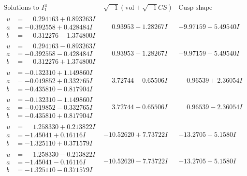 \documentclass[1p]{elsarticle_modified}
\theoremstyle{definition}
\newcommand{\I}{\sqrt{-1}}
\begin{document}
$$\begin{array}{c|c|c}  
\text{Solutions to }I^u_{1}& \I (\text{vol} + \sqrt{-1}CS) & \text{Cusp shape}\\
 \hline 
\begin{aligned}
u &= \phantom{-}0.294163 + 0.893263 I \\
a &= -0.392558 + 0.428484 I \\
b &= \phantom{-}0.312276 - 1.374800 I\end{aligned}
 & \phantom{-}0.93953 - 1.28267 I & -9.97159 + 5.49540 I \\ \hline\begin{aligned}
u &= \phantom{-}0.294163 - 0.893263 I \\
a &= -0.392558 - 0.428484 I \\
b &= \phantom{-}0.312276 + 1.374800 I\end{aligned}
 & \phantom{-}0.93953 + 1.28267 I & -9.97159 - 5.49540 I \\ \hline\begin{aligned}
u &= -0.132310 + 1.149860 I \\
a &= -0.019852 + 0.332765 I \\
b &= -0.435810 - 0.817904 I\end{aligned}
 & \phantom{-}3.72744 - 0.65506 I & \phantom{-}0.96539 + 2.36054 I \\ \hline\begin{aligned}
u &= -0.132310 - 1.149860 I \\
a &= -0.019852 - 0.332765 I \\
b &= -0.435810 + 0.817904 I\end{aligned}
 & \phantom{-}3.72744 + 0.65506 I & \phantom{-}0.96539 - 2.36054 I \\ \hline\begin{aligned}
u &= \phantom{-}1.258330 + 0.213822 I \\
a &= -1.45041 + 0.16116 I \\
b &= -1.325110 + 0.371579 I\end{aligned}
 & -10.52620 + 7.73722 I & -13.2705 - 5.1580 I \\ \hline\begin{aligned}
u &= \phantom{-}1.258330 - 0.213822 I \\
a &= -1.45041 - 0.16116 I \\
b &= -1.325110 - 0.371579 I\end{aligned}
 & -10.52620 - 7.73722 I & -13.2705 + 5.1580 I \\ \hline\begin{aligned}

\end{aligned}
\end{array}$$
\end{document}
